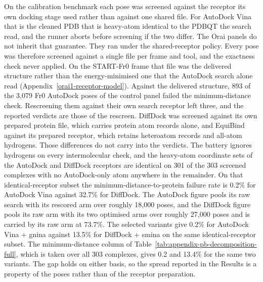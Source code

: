 On the calibration benchmark each pose was screened against the receptor its own docking stage used rather than against one shared file. For AutoDock Vina that is the cleaned PDB that is heavy-atom identical to the PDBQT the search read, and the runner aborts before screening if the two differ. The Orai panels do not inherit that guarantee. They ran under the shared-receptor policy. Every pose was therefore screened against a single file per frame and tool, and the exactness check never applied. On the START-Fr0 frame that file was the delivered structure rather than the energy-minimised one that the AutoDock search alone read (Appendix~\ref{orai1-receptor-model}). Against the delivered structure, 893 of the 3,079 Fr0 AutoDock poses of the control panel failed the minimum-distance check. Rescreening them against their own search receptor left three, and the reported verdicts are those of the rescreen. DiffDock was screened against its own prepared protein file, which carries protein atom records alone, and EquiBind against its prepared receptor, which retains heteroatom records and all-atom hydrogens. Those differences do not carry into the verdicts. The battery ignores hydrogens on every intermolecular check, and the heavy-atom coordinate sets of the AutoDock and DiffDock receptors are identical on 301 of the 303 screened complexes with no AutoDock-only atom anywhere in the remainder. On that identical-receptor subset the minimum-distance-to-protein failure rate is 0.2\% for AutoDock Vina against 32.7\% for DiffDock. The AutoDock figure pools its raw search with its rescored arm over roughly 18,000 poses, and the DiffDock figure pools its raw arm with its two optimised arms over roughly 27,000 poses and is carried by its raw arm at 73.7\%. The selected variants give 0.2\% for AutoDock Vina + gnina against 13.5\% for DiffDock + smina on the same identical-receptor subset. The minimum-distance column of Table~\ref{tab:appendix-pb-decomposition-full}, which is taken over all 303 complexes, gives 0.2 and 13.4\% for the same two variants. The gap holds on either basis, so the spread reported in the Results is a property of the poses rather than of the receptor preparation.

